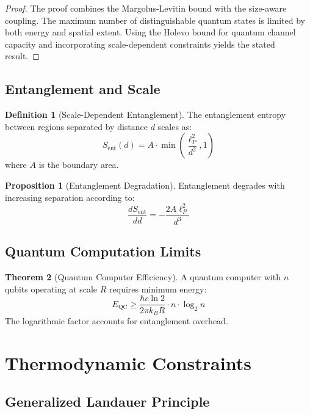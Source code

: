 \documentclass[11pt,a4paper]{article}
\theoremstyle{definition}
\newtheorem{definition}{Definition}[section]
\newtheorem{theorem}{Theorem}[section]
\newtheorem{proposition}[theorem]{Proposition}
\begin{document}
\begin{proof}
The proof combines the Margolus-Levitin bound with the size-aware coupling. The maximum number of distinguishable quantum states is limited by both energy and spatial extent. Using the Holevo bound for quantum channel capacity and incorporating scale-dependent constraints yields the stated result.
\end{proof}

\subsection{Entanglement and Scale}

\begin{definition}[Scale-Dependent Entanglement]
The entanglement entropy between regions separated by distance $d$ scales as:
\begin{equation}
S_{\text{ent}}(d) = A \cdot \min\left(\frac{\ell_P^2}{d^2}, 1\right)
\end{equation}
where $A$ is the boundary area.
\end{definition}

\begin{proposition}[Entanglement Degradation]
Entanglement degrades with increasing separation according to:
\begin{equation}
\frac{dS_{\text{ent}}}{dd} = -\frac{2A\ell_P^2}{d^3}
\end{equation}
\end{proposition}

\subsection{Quantum Computation Limits}

\begin{theorem}[Quantum Computer Efficiency]
A quantum computer with $n$ qubits operating at scale $R$ requires minimum energy:
\begin{equation}
E_{\text{QC}} \geq \frac{\hbar c \ln 2}{2\pi k_B R} \cdot n \cdot \log_2 n
\end{equation}
The logarithmic factor accounts for entanglement overhead.
\end{theorem}

\section{Thermodynamic Constraints}

\subsection{Generalized Landauer Principle}
\end{document}
